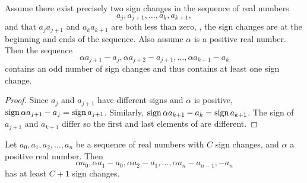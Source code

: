 \begin {proposition}\label{PRS:SignChange:Propa}
Assume there exist precisely two sign changes in the sequence of real
numbers
\[
a_j, a_{j+1}, \ldots, a_k, a_{k+1},
\]
and that $a_j a_{j+1}$ and $a_k a_{k+1}$ are both less than zero, \ie,
the sign changes are at the beginning and ends of the sequence.  Also
assume $\alpha$ is a positive real number.  Then the sequence
\begin{equation}\label{PRS:SignSeq:Eq}
\alpha a_{j+1} - a_j, \alpha a_{j+2} - a_{j+1}, \ldots, 
\alpha a_{k+1} - a_k
\end{equation}
contains an odd number of sign changes and thus contains at least one
sign change. 
\end{proposition}

\begin{proof}
Since $a_j$ and $a_{j+1}$ have different signs and $\alpha$ is
positive, $\mathop{\rm sign}\nolimits \alpha a_{j+1} - a_j = \mathop{\rm sign}\nolimits a_{j+1}$.  Similarly, 
$\mathop{\rm sign}\nolimits \alpha a_{k+1} - a_k = \mathop{\rm sign}\nolimits a_{k+1}$.  The sign of $a_{j+1}$
and $a_{k+1}$ differ so the first and last elements of
 are different.
\end{proof}

\begin{proposition}\label{PRS:SignChange:Propb}
Let $a_0, a_1, a_2, \ldots, a_n$ be a sequence of real numbers with
$C$ sign changes, and $\alpha$ a positive real number.  Then
\begin{equation} \label{PRS:SignSeq:Eqb}
\alpha a_0, \alpha a_1 - a_0, \alpha a_2 - a_1, \ldots, \alpha a_n -
a_{n-1}, - a_n
\end{equation}
has at least $C+1$ sign changes.
\end{proposition}

